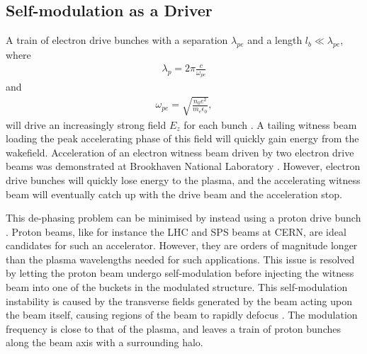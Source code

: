 \documentclass[aps,prstab,reprint,amsmath,amssymb,groupedaddress]{revtex4-1}
\begin{document}
\subsection[\label{S:I:SMI}]{Self-modulation as a Driver}

A train of electron drive bunches with a separation $\lambda_{pe}$ and a length $l_{b} \ll \lambda_{pe}$, where
\begin{align}
    \lambda_{p} = 2\pi\frac{c}{\omega_{pe}} \label{EQ:LambdaP}
\end{align}
and
\begin{align}
    \omega_{pe} = \sqrt{\frac{n_{0} e^{2}}{m_{e} \epsilon_{0}}}, \label{EQ:OmegaP}
\end{align}
will drive an increasingly strong field $E_{z}$ for each bunch \cite{chen:1985}. A tailing witness beam loading the peak
accelerating phase of this field will quickly gain energy from the wakefield. Acceleration of an electron witness beam
driven by two electron drive beams was demonstrated at Brookhaven National Laboratory \cite{muggli:2011}. However,
electron drive bunches will quickly lose energy to the plasma, and the accelerating witness beam will eventually catch
up with the drive beam and the acceleration stop.

This de-phasing problem can be minimised by instead using a proton drive bunch \cite{caldwell:2009}. Proton beams, like
for instance the LHC and SPS beams at CERN, are ideal candidates for such an accelerator. However, they are orders of
magnitude longer than the plasma wavelengths needed for such applications. This issue is resolved by letting the proton
beam undergo self-modulation before injecting the witness beam into one of the buckets in the modulated structure. This
self-modulation instability is caused by the transverse fields generated by the beam acting upon the beam itself,
causing regions of the beam to rapidly defocus \cite{kumar:2010}. The modulation frequency is close to that of the
plasma, and leaves a train of proton bunches along the beam axis with a surrounding halo.
\end{document}
